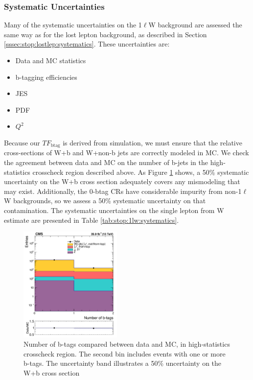 \subsubsection{Systematic Uncertainties}
\label{sssec:stop:1lw:systematics}

Many of the systematic uncertainties on the 1$\ell$W background are
assessed the same way as for the lost lepton background, as described
in Section \ref{sssec:stop:lostlep:systematics}. These uncertainties
are:
\begin{itemize}
\item Data and MC statistics
\item b-tagging efficiencies
\item JES
\item PDF
\item $Q^2$
\end{itemize}

Because our $TF_\text{btag}$ is derived from simulation, we must ensure that
the relative cross-sections of W+b and W+non-b jets are correctly
modeled in MC. We check the agreement between data and MC on the number of
b-jets in the high-statistics crosscheck region described above. As
Figure \ref{fig:stop:1lw:wb} shows, a 50\% systematic uncertainty on
the W+b cross section adequately covers any mismodeling that may
exist. Additionally, the 0-btag CRs have considerable impurity from
non-1$\ell$W backgrounds, so we assess a 50\% systematic uncertainty on
that contamination. The systematic uncertainties on the single lepton
from W estimate are presented in Table \ref{tab:stop:1lw:systematics}.

\begin{figure}[htb]
\centering
\includegraphics[width=0.45\textwidth]{figures/cr0b_nbtags_crosscheck.pdf}
\caption{Number of b-tags compared between data and MC, in
  high-statistics crosscheck region. The second bin includes events
  with one or more b-tags. The uncertainty band illustrates a 50\%
  uncertainty on the W+b cross section}
\label{fig:stop:1lw:wb}
\end{figure}

